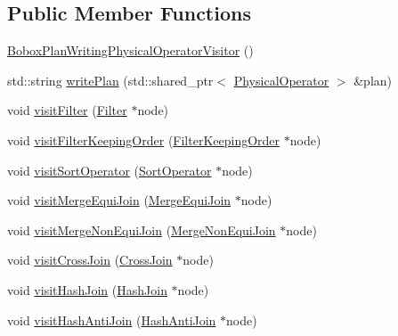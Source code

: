 \subsection*{Public Member Functions}
\begin{DoxyCompactItemize}
\item 
\hyperlink{classrafe_1_1_bobox_plan_writing_physical_operator_visitor_afa5e686be89010277091a1d2f1f06dc2}{Bobox\+Plan\+Writing\+Physical\+Operator\+Visitor} ()
\item 
std\+::string \hyperlink{classrafe_1_1_bobox_plan_writing_physical_operator_visitor_ae1b065e58edaf26fa63ce0ad6e7d4acd}{write\+Plan} (std\+::shared\+\_\+ptr$<$ \hyperlink{classrafe_1_1_physical_operator}{Physical\+Operator} $>$ \&plan)
\item 
void \hyperlink{classrafe_1_1_bobox_plan_writing_physical_operator_visitor_a729ee192bceef48ed5221447427be2a4}{visit\+Filter} (\hyperlink{classrafe_1_1_filter}{Filter} $\ast$node)
\item 
void \hyperlink{classrafe_1_1_bobox_plan_writing_physical_operator_visitor_a34f3d494a32fdc1e694ea4568f09db28}{visit\+Filter\+Keeping\+Order} (\hyperlink{classrafe_1_1_filter_keeping_order}{Filter\+Keeping\+Order} $\ast$node)
\item 
void \hyperlink{classrafe_1_1_bobox_plan_writing_physical_operator_visitor_a63be13a7222bfdb4a317334b0b2f892d}{visit\+Sort\+Operator} (\hyperlink{classrafe_1_1_sort_operator}{Sort\+Operator} $\ast$node)
\item 
void \hyperlink{classrafe_1_1_bobox_plan_writing_physical_operator_visitor_a424e82f02063f08ec2849a4728f49b83}{visit\+Merge\+Equi\+Join} (\hyperlink{classrafe_1_1_merge_equi_join}{Merge\+Equi\+Join} $\ast$node)
\item 
void \hyperlink{classrafe_1_1_bobox_plan_writing_physical_operator_visitor_af9342d338c7b1f83e4c6bb2250915adc}{visit\+Merge\+Non\+Equi\+Join} (\hyperlink{classrafe_1_1_merge_non_equi_join}{Merge\+Non\+Equi\+Join} $\ast$node)
\item 
void \hyperlink{classrafe_1_1_bobox_plan_writing_physical_operator_visitor_af8ff4c17855ea7872ed2871aa317591d}{visit\+Cross\+Join} (\hyperlink{classrafe_1_1_cross_join}{Cross\+Join} $\ast$node)
\item 
void \hyperlink{classrafe_1_1_bobox_plan_writing_physical_operator_visitor_ad0924de22102447e0e6c38a90432f3c6}{visit\+Hash\+Join} (\hyperlink{classrafe_1_1_hash_join}{Hash\+Join} $\ast$node)
\item 
void \hyperlink{classrafe_1_1_bobox_plan_writing_physical_operator_visitor_a4c75cb58ec95bc07e9923a3b7c0c2175}{visit\+Hash\+Anti\+Join} (\hyperlink{classrafe_1_1_hash_anti_join}{Hash\+Anti\+Join} $\ast$node)

\end{DoxyCompactItemize}

